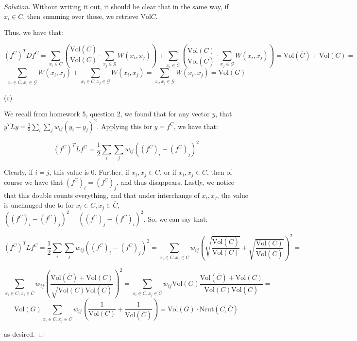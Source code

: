 \documentclass[10pt]{article}
\newcommand{\vol}{{\text{Vol}}}
\begin{document}
\begin{proof}[Solution]
Without writing it out, it should be clear that in the same way, if $x_i \in \overline{C}$, then summing over those, we retrieve $\vol{C}$.

Thus, we have that:

$$ (f^C)^T D f^C = \sum_{x_i \in C}\left(  \frac{\vol(\overline{C})}{\vol(C)} \cdot \sum_{x_j \in \mathcal{G}}  W(x_i, x_j) \right) +  \sum_{x_i \in \overline{C}} \left( \frac{\vol(C)}{\vol(\overline{C})} \cdot \sum_{x_j \in \mathcal{G}}  W(x_i, x_j)\right) = \vol(\overline{C}) + \vol(C) =$$
$$ \sum_{x_i \in \overline{C}, x_j \in \mathcal{G}} W(x_i, x_j) + \sum_{x_i \in C, x_j \in \mathcal{G}} W(x_i, x_j) = \sum_{x_i, x_j \in \mathcal{G}} W(x_i, x_j) = \vol(G)$$

(c)

We recall from homework 5, question 2, we found that for any vector $y$, that $y^T L y = \frac{1}{2} \sum_i \sum_j w_{ij} (y_i - y_j)^2$. Applying this for $y = f^C$, we have that:

$$ (f^C)^T L f^C = \frac{1}{2}  \sum_i \sum_j w_{ij} ((f^C)_i - (f^C)_j)^2$$

Clearly, if $i = j$, this value is 0. Further, if $x_i, x_j \in C$, or if $x_i, x_j \in \overline{C}$, then of course we have that $(f^C)_i  =  (f^C)_j$, and thus disappears. Lastly, we notice that this double counts everything, and that under interchange of $x_i, x_j$, the value is unchanged due to for $x_i \in C, x_j \in \overline{C}$, $ ((f^C)_i - (f^C)_j)^2 =  ((f^C)_j - (f^C)_i)^2$. So, we can say that:

$$(f^C)^T L f^C = \frac{1}{2}  \sum_i \sum_j w_{ij} ((f^C)_i - (f^C)_j)^2 = \sum_{x_i \in C, x_j \in \overline{C}} w_{ij} \left(\sqrt{\frac{\vol(\overline{C})}{\vol(C)}}+ \sqrt{\frac{\vol(C)}{\vol(\overline{C})}}\right)^2 =$$

$$  \sum_{x_i \in C, x_j \in \overline{C}} w_{ij} \left( \frac{\vol(\overline{C})+ \vol(C)}{\sqrt{\vol(C)\vol(\overline{C})}} \right)^2 = \sum_{x_i \in C, x_j \in \overline{C}} w_{ij}\vol(G) \frac{\vol(\overline{C})+ \vol(C)}{\vol(C)\vol(\overline{C})}=$$ 
$$\vol(G) \sum_{x_i \in C, x_j \in \overline{C}}w_{ij} \left( \frac{1}{\vol(C)} + \frac{1}{\vol(\overline{C})} \right) = \vol(G) \cdot \text{Ncut}(C,\overline{C}) $$

as desired.

\end{proof}
\end{document}
